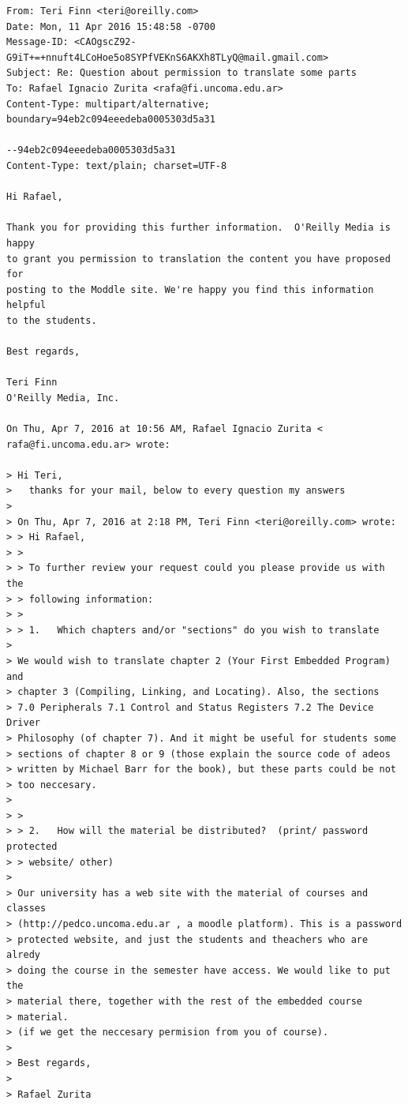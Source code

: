 \documentclass[12pt]{article}
\begin{document}
\begin{verbatim}
From: Teri Finn <teri@oreilly.com>
Date: Mon, 11 Apr 2016 15:48:58 -0700
Message-ID: <CAOgscZ92-G9iT+=+nnuft4LCoHoe5o8SYPfVEKnS6AKXh8TLyQ@mail.gmail.com>
Subject: Re: Question about permission to translate some parts
To: Rafael Ignacio Zurita <rafa@fi.uncoma.edu.ar>
Content-Type: multipart/alternative; boundary=94eb2c094eeedeba0005303d5a31

--94eb2c094eeedeba0005303d5a31
Content-Type: text/plain; charset=UTF-8

Hi Rafael,

Thank you for providing this further information.  O'Reilly Media is happy
to grant you permission to translation the content you have proposed for
posting to the Moddle site. We're happy you find this information helpful
to the students.

Best regards,

Teri Finn
O'Reilly Media, Inc.

On Thu, Apr 7, 2016 at 10:56 AM, Rafael Ignacio Zurita <
rafa@fi.uncoma.edu.ar> wrote:

> Hi Teri,
>   thanks for your mail, below to every question my answers
>
> On Thu, Apr 7, 2016 at 2:18 PM, Teri Finn <teri@oreilly.com> wrote:
> > Hi Rafael,
> >
> > To further review your request could you please provide us with the
> > following information:
> >
> > 1.   Which chapters and/or "sections" do you wish to translate
>
> We would wish to translate chapter 2 (Your First Embedded Program) and
> chapter 3 (Compiling, Linking, and Locating). Also, the sections
> 7.0 Peripherals 7.1 Control and Status Registers 7.2 The Device Driver
> Philosophy (of chapter 7). And it might be useful for students some
> sections of chapter 8 or 9 (those explain the source code of adeos
> written by Michael Barr for the book), but these parts could be not
> too neccesary.
>
> >
> > 2.   How will the material be distributed?  (print/ password protected
> > website/ other)
>
> Our university has a web site with the material of courses and classes
> (http://pedco.uncoma.edu.ar , a moodle platform). This is a password
> protected website, and just the students and theachers who are alredy
> doing the course in the semester have access. We would like to put the
> material there, together with the rest of the embedded course
> material.
> (if we get the neccesary permision from you of course).
>
> Best regards,
>
> Rafael Zurita
\end{verbatim}






\end{document}
